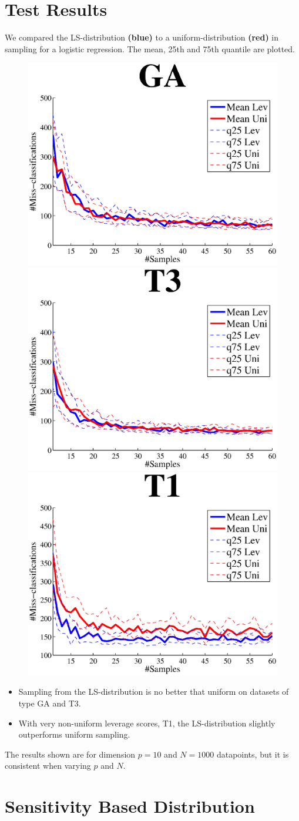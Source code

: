 \section{Test Results}
We compared the LS-distribution {\bf\color{blue}(blue)} to a uniform-distribution {\bf\color{red}(red)} in sampling for a logistic regression. The mean, 25th and 75th quantile are plotted.
\begin{figure}[H]
\centering
\includegraphics[width=.32\linewidth]{02460_poster_template/images/GA.eps}
\includegraphics[width=.32\linewidth]{02460_poster_template/images/T3.eps}
\includegraphics[width=.32\linewidth]{02460_poster_template/images/T1.eps}
\end{figure}	
\begin{itemize}
\item Sampling from the LS-distribution is no better that uniform on datasets of type GA and T3.
\item With very non-uniform leverage scores, T1, the LS-distribution slightly outperforms uniform sampling.
\end{itemize}
The results shown are for dimension $p = 10$ and $N = 1000$ datapoints, but it is consistent when varying $p$ and $N$. \\
%

\section{Sensitivity Based Distribution}


